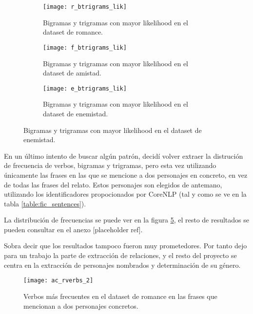 \documentclass{pre-tfg}
\newcommand{\refToAnexoDatosRFE}{[placeholder ref]}
\begin{document}
\begin{figure}[t!]
	\centering
	
	\begin{subfigure}{\textwidth}
		\texttt{[image: r\_btrigrams\_lik]}
		\caption{Bigramas y trigramas con mayor likelihood en el dataset de romance.}
		\label{fig:r_btrigram_lik}
	\end{subfigure}

	\begin{subfigure}{\textwidth}
		\texttt{[image: f\_btrigrams\_lik]}
		\caption{Bigramas y trigramas con mayor likelihood en el dataset de amistad.}
		\label{fig:f_btrigram_lik}
	\end{subfigure}

	\begin{subfigure}{\textwidth}
		\texttt{[image: e\_btrigrams\_lik]}
		\caption{Bigramas y trigramas con mayor likelihood en el dataset de enemistad.}
		\label{fig:e_btrigram_lik}
	\end{subfigure}
\end{figure}

En un último intento de buscar algún patrón, decidí volver extraer la distrución de frecuencia de verbos, bigramas y trigramas, pero esta vez utilizando únicamente las frases en las que se mencione a dos personajes en concreto, en vez de todas las frases del relato. Estos personajes son elegidos de antemano, utilizando los identificadores propocionados por CoreNLP (tal y como se ve en la tabla \ref{table:fic_sentences}).

 La distribución de frecuencias se puede ver en la figura \ref{fig:r_verb_freq_in_character_mentions}, el resto de resultados se pueden consultar en el anexo \refToAnexoDatosRFE.
 
 Sobra decir que los resultados tampoco fueron muy prometedores. Por tanto dejo para un trabajo la parte de extracción de relaciones, y el resto del proyecto se centra en la extracción de personajes nombrados y determinación de su género.

\begin{figure}
	\centering
	\texttt{[image: ac\_rverbs\_2]}
	\caption{Verbos más frecuentes en el dataset de romance en las frases que mencionan a dos personajes concretos.}
	\label{fig:r_verb_freq_in_character_mentions}
\end{figure}
\end{document}
